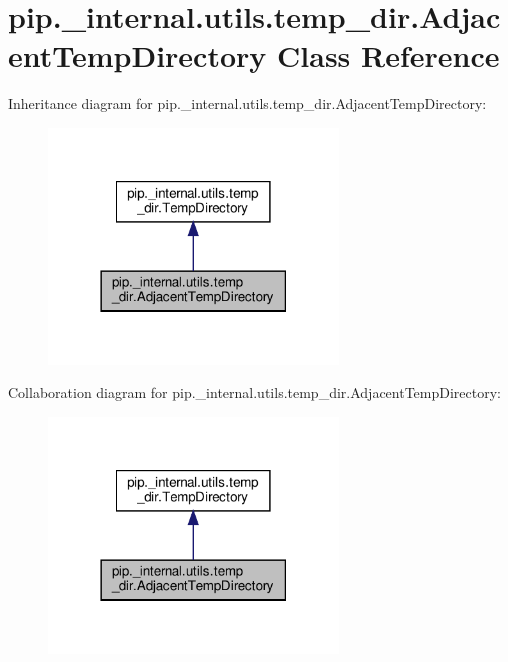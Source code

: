 \hypertarget{classpip_1_1__internal_1_1utils_1_1temp__dir_1_1AdjacentTempDirectory}{}\section{pip.\+\_\+internal.\+utils.\+temp\+\_\+dir.\+Adjacent\+Temp\+Directory Class Reference}
\label{classpip_1_1__internal_1_1utils_1_1temp__dir_1_1AdjacentTempDirectory}


Inheritance diagram for pip.\+\_\+internal.\+utils.\+temp\+\_\+dir.\+Adjacent\+Temp\+Directory\+:
\nopagebreak
\begin{figure}[H]
\begin{center}
\leavevmode
\includegraphics[width=218pt]{classpip_1_1__internal_1_1utils_1_1temp__dir_1_1AdjacentTempDirectory__inherit__graph}
\end{center}
\end{figure}


Collaboration diagram for pip.\+\_\+internal.\+utils.\+temp\+\_\+dir.\+Adjacent\+Temp\+Directory\+:
\nopagebreak
\begin{figure}[H]
\begin{center}
\leavevmode
\includegraphics[width=218pt]{classpip_1_1__internal_1_1utils_1_1temp__dir_1_1AdjacentTempDirectory__coll__graph}
\end{center}
\end{figure}

